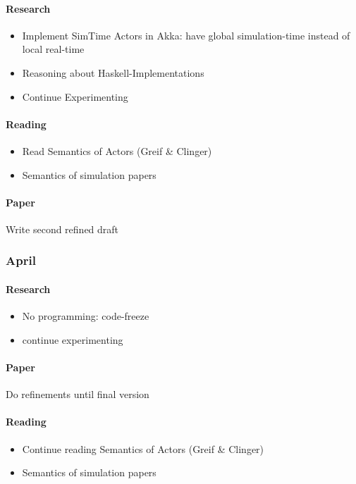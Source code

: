 \paragraph{Research}
	\begin{itemize}
		\item Implement SimTime Actors in Akka: have global simulation-time instead of local real-time
		\item Reasoning about Haskell-Implementations
		\item Continue Experimenting
	\end{itemize}
	
\paragraph{Reading}
	\begin{itemize}
		\item Read Semantics of Actors (Greif \& Clinger)
		\item Semantics of simulation papers
	\end{itemize}
	
\paragraph{Paper} Write second refined draft 

\subsubsection{April}
\paragraph{Research} 
	\begin{itemize}
		\item No programming: code-freeze
		\item continue experimenting
	\end{itemize}
	
\paragraph{Paper} Do refinements until final version
	
\paragraph{Reading}
	\begin{itemize}
		\item Continue reading Semantics of Actors (Greif \& Clinger)
		\item Semantics of simulation papers
	\end{itemize}
	
